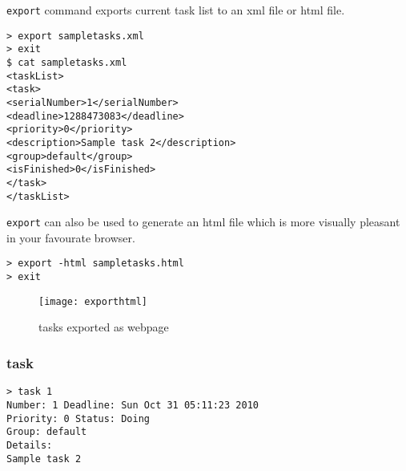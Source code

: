 \documentclass[12pt, a4paper]{article}
\begin{document}
\begin{enumerate}
\texttt{export} command exports current task list to an xml file or html file.

\texttt{\textgreater \ export sampletasks.xml \footnotemark\\
  \textgreater \ exit\\
  \$ cat sampletasks.xml\\
    <taskList>\\
        <task>\\
            <serialNumber>1</serialNumber>\\
            <deadline>1288473083</deadline>\\
            <priority>0</priority>\\
            <description>Sample task 2</description>\\
            <group>default</group>\\
            <isFinished>0</isFinished>\\
        </task>\\
    </taskList>}

 
\texttt{export} can also be used to generate an html file which is more visually pleasant in your favourate browser.

\texttt{\textgreater \ export -html sampletasks.html\\
    \textgreater \ exit}

\begin{figure}[htbp]
  \centering
  \texttt{[image: exporthtml]}
  \caption{tasks exported as webpage \footnotemark}
\end{figure}

\end{enumerate}

\subsubsection{task}

\texttt{\textgreater \ task 1\\
  Number:  1       Deadline:   Sun Oct 31 05:11:23 2010\\
  Priority:  0         Status:   Doing\\
  Group:  default\\
  Details:\\
  Sample task 2 \footnotemark \\}
\end{document}

